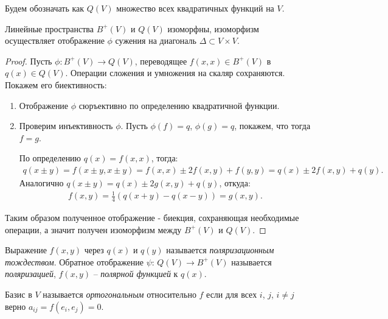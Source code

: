 \begin{agreement}
    Будем обозначать как $Q(V)$ множество всех квадратичных функций на $V$.
\end{agreement}

\begin{theorem}
    Линейные пространства $B^+(V)$ и $Q(V)$ изоморфны, изоморфизм осуществляет отображение $\phi$ 
    сужения на диагональ $\Delta \subset V \times V$.
\end{theorem}

\begin{proof}
    Пусть $\phi: B^+(V) \to Q(V)$, переводящее $f(x, x) \in B^+(V)$ в $q(x) \in Q(V)$. 
    Операции сложения и умножения на скаляр сохраняются. Покажем его биективность:
    \begin{enumerate}
        \item Отображение $\phi$ сюръективно по определению квадратичной функции.  
        \item Проверим инъективность $\phi$. Пусть $\phi(f) = q$, $\phi(g) = q$, покажем, что тогда 
        $f = g$. 
        
        По определению $q(x) = f(x, x)$, тогда:
        \begin{gather*}
            q(x \pm y) = f(x \pm y, x \pm y) = f(x, x) \pm 2 f(x, y) + f(y, y) =
            q(x) \pm 2 f(x, y) + q(y).
        \end{gather*}
        Аналогично $q(x \pm y) = q(x) \pm 2 g(x, y) + q(y)$, откуда:
        \begin{gather*}
            f(x, y) = \frac{1}{4} (q(x+y) - q(x-y)) = g(x, y).
        \end{gather*} 
    \end{enumerate} 
    Таким образом полученное отображение - биекция, сохраняющая необходимые операции, а значит 
    получен изоморфизм между $B^+(V)$ и $Q(V)$.
\end{proof}

\begin{definition}
    Выражение $f(x, y)$ через $q(x)$ и $q(y)$ называется \textit{поляризационным тождеством}.
    Обратное отображение $\psi:\, Q(V) \to B^+(V)$ называется \textit{поляризацией},
    $f(x, y)$ -- \textit{полярной функцией} к $q(x)$.
\end{definition}

\begin{definition}
    Базис в $V$ называется \textit{ортогональным} относительно $f$ если для всех $i$, $j$, $i \neq j$ верно 
    $a_{ij} = f(e_i, e_j) = 0$.
\end{definition}

